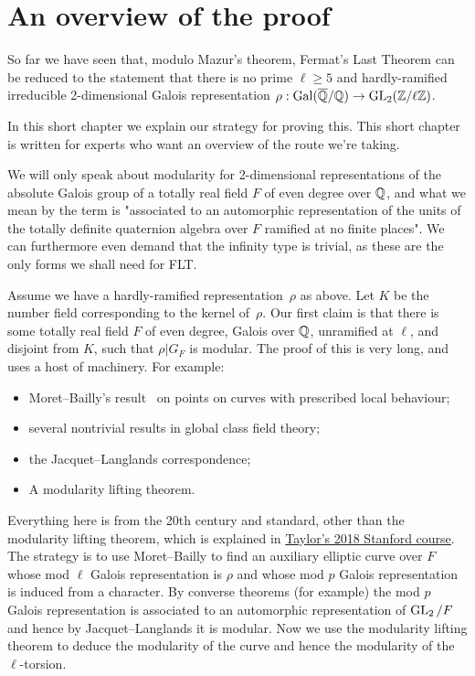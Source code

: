 \chapter{An overview of the proof}\label{ch_overview}

So far we have seen that, modulo Mazur's theorem, Fermat's Last Theorem can be reduced
to the statement that there is no prime $\ell\geq 5$ and hardly-ramified
irreducible 2-dimensional Galois representation $\rho:\operatorname{Gal}(\overline{\mathbb{Q}}/\mathbb{Q})\to\operatorname{GL}_2(\mathbb{Z}/\ell\mathbb{Z})$.

In this short chapter we explain our strategy for proving this. This short chapter is written
for experts who want an overview of the route we're taking.

We will only speak about modularity for 2-dimensional representations of the
absolute Galois group of a totally real field $F$ of even degree over $\mathbb{Q}$, and
what we mean by the term is "associated to an automorphic representation of the
units of the totally definite quaternion algebra over $F$ ramified at no finite places".
We can furthermore even demand that the infinity type is trivial, as these are the only
forms we shall need for FLT.

Assume we have a hardly-ramified representation~$\rho$ as above. Let $K$
be the number field corresponding to the kernel of~$\rho$. Our first claim
is that there is some totally real field $F$ of even degree, Galois over $\mathbb{Q}$,
unramified at $\ell$, and disjoint from $K$, such that $\rho|G_F$ is modular. 
The proof of this is very long, and uses a host of machinery. For example:
\begin{itemize}
    \item Moret--Bailly's result~\cite{moret-bailly} on points on curves with prescribed 
    local behaviour;
    \item several nontrivial results in global class field theory;
    \item the Jacquet--Langlands correspondence;
    \item A modularity lifting theorem.
\end{itemize}

Everything here is from the 20th century and standard, other than the modularity
lifting theorem, which is explained in \href{https://math.berkeley.edu/~fengt/249A_2018.pdf}
{Taylor's 2018 Stanford course}. The strategy is to use Moret--Bailly to find an auxiliary 
elliptic curve over $F$ whose mod $\ell$ Galois representation is $\rho$ and whose
mod $p$ Galois representation is induced from a character. By converse theorems (for example)
the mod $p$ Galois representation is associated to an automorphic representation of
$\operatorname{GL}_2/F$ and hence by Jacquet--Langlands it is modular. Now we use the
modularity lifting theorem to deduce the modularity of the curve and hence
the modularity of the $\ell$-torsion. 

